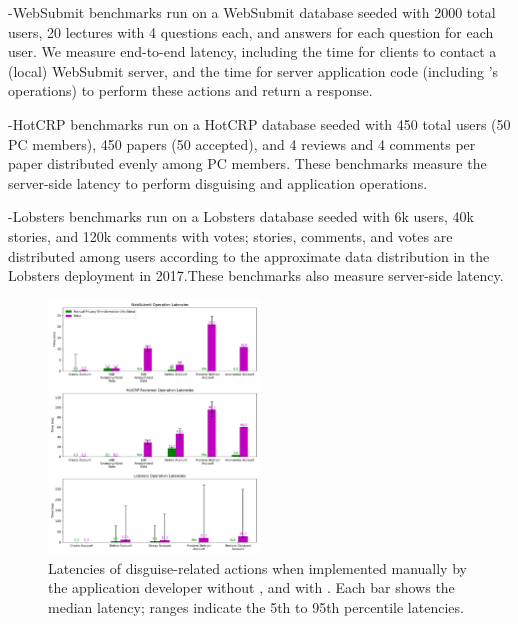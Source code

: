 \sys-WebSubmit benchmarks run on a WebSubmit database seeded with 2000 total users, 20
lectures with 4 questions each, and answers for each question for each user.  We measure end-to-end
latency, including the time for clients to contact a (local) WebSubmit server, and the time for
server application code (including \sys's operations) to perform these actions and return a
response.

\sys-HotCRP benchmarks run on a HotCRP database seeded with 450 total users (50 PC members),
450 papers (50 accepted), and 4 reviews and 4 comments per paper distributed evenly among PC
members. These benchmarks measure the server-side latency to perform disguising and application
operations.

\sys-Lobsters benchmarks run on a Lobsters database seeded with 6k users, 40k stories, and 120k
comments with votes; stories, comments, and votes are distributed among users according to the
approximate data distribution in the Lobsters deployment in 2017.These benchmarks also
measure server-side latency.

\begin{figure}[t!]
    \centering
    \includegraphics[width=0.5\textwidth]{figs/client_op_stats}
    \caption{Latencies of disguise-related actions when implemented manually by the
    application developer without \sys, and with \sys.
    Each bar shows the median latency; ranges indicate the 5th to 95th
    percentile latencies.  }
    \label{fig:client_opstats}
\end{figure}

